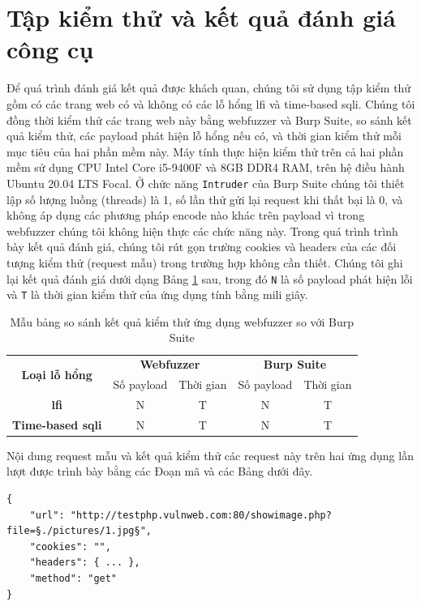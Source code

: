 \section{Tập kiểm thử và kết quả đánh giá công cụ}
Để quá trình đánh giá kết quả được khách quan, chúng tôi sử dụng tập kiểm thử gồm có các trang web có và không có các lỗ hổng \acrshort{lfi} và time-based \acrshort{sqli}. Chúng tôi đồng thời kiểm thử các trang web này bằng webfuzzer và Burp Suite, so sánh kết quả kiểm thử, các payload phát hiện lỗ hổng nếu có, và thời gian kiểm thử mỗi mục tiêu của hai phần mềm này. Máy tính thực hiện kiểm thử trên cả hai phần mềm sử dụng CPU Intel Core i5-9400F và 8GB DDR4 RAM, trên hệ điều hành Ubuntu 20.04 LTS Focal. Ở chức năng \texttt{Intruder} của Burp Suite chúng tôi thiết lập số lượng luồng (threads) là 1, số lần thử gửi lại request khi thất bại là 0, và không áp dụng các phương pháp encode nào khác trên payload vì trong webfuzzer chúng tôi không hiện thực các chức năng này. Trong quá trình trình bày kết quả đánh giá, chúng tôi rút gọn trường cookies và headers của các đối tượng kiểm thử (request mẫu) trong trường hợp không cần thiết. Chúng tôi ghi lại kết quả đánh giá dưới dạng Bảng \ref{tab:sample-testing-results} sau, trong đó \texttt{N} là số payload phát hiện lỗi và \texttt{T} là thời gian kiểm thử của ứng dụng tính bằng mili giây.
\FloatBarrier
\begin{table}[ht]
    \centering
    \caption{Mẫu bảng so sánh kết quả kiểm thử ứng dụng webfuzzer so với Burp Suite}
    \label{tab:sample-testing-results}
    \begin{tabular}[ht]{ccccc}
        \toprule[1pt]\midrule[0.3pt]
            \multirow{2}{*}{\textbf{Loại lỗ hổng}}&\multicolumn{2}{c}{\textbf{Webfuzzer}}&\multicolumn{2}{c}{\textbf{Burp Suite}}\\
            \cmidrule(lr){2-3}\cmidrule(lr){4-5}{}&Số payload&Thời gian&Số payload&Thời gian\\
        \midrule[0.3pt]
            \textbf{\acrshort{lfi}}&N&T&N&T\\\addlinespace
            \textbf{Time-based \acrshort{sqli}}&N&T&N&T\\
        \midrule[0.3pt]\bottomrule[1pt]
    \end{tabular}
\end{table}
\FloatBarrier
Nội dung request mẫu và kết quả kiểm thử các request này trên hai ứng dụng lần lượt được trình bày bằng các Đoạn mã và các Bảng dưới đây.
\begin{lstlisting}[style=ES6, label={lst:base-request-1}, caption={Request mẫu 1 có lỗ hổng \acrshort{lfi}}]
{
    "url": "http://testphp.vulnweb.com:80/showimage.php?file=§./pictures/1.jpg§",
    "cookies": "",
    "headers": { ... },
    "method": "get"
}
\end{lstlisting}

